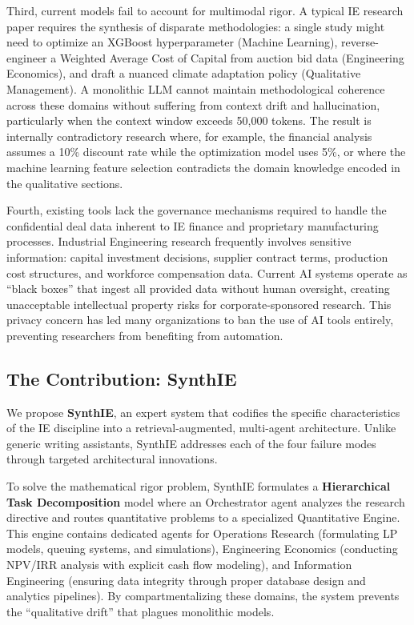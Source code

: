 \documentclass[12pt,a4paper]{article}
\begin{document}
Third, current models fail to account for multimodal rigor. A typical IE research paper requires the synthesis of disparate methodologies: a single study might need to optimize an XGBoost hyperparameter (Machine Learning), reverse-engineer a Weighted Average Cost of Capital from auction bid data (Engineering Economics), and draft a nuanced climate adaptation policy (Qualitative Management). A monolithic LLM cannot maintain methodological coherence across these domains without suffering from context drift and hallucination, particularly when the context window exceeds 50,000 tokens. The result is internally contradictory research where, for example, the financial analysis assumes a 10\% discount rate while the optimization model uses 5\%, or where the machine learning feature selection contradicts the domain knowledge encoded in the qualitative sections.

Fourth, existing tools lack the governance mechanisms required to handle the confidential deal data inherent to IE finance and proprietary manufacturing processes. Industrial Engineering research frequently involves sensitive information: capital investment decisions, supplier contract terms, production cost structures, and workforce compensation data. Current AI systems operate as ``black boxes'' that ingest all provided data without human oversight, creating unacceptable intellectual property risks for corporate-sponsored research. This privacy concern has led many organizations to ban the use of AI tools entirely, preventing researchers from benefiting from automation.

\subsection{The Contribution: SynthIE}

We propose \textbf{SynthIE}, an expert system that codifies the specific characteristics of the IE discipline into a retrieval-augmented, multi-agent architecture. Unlike generic writing assistants, SynthIE addresses each of the four failure modes through targeted architectural innovations.

To solve the mathematical rigor problem, SynthIE formulates a \textbf{Hierarchical Task Decomposition} model where an Orchestrator agent analyzes the research directive and routes quantitative problems to a specialized Quantitative Engine. This engine contains dedicated agents for Operations Research (formulating LP models, queuing systems, and simulations), Engineering Economics (conducting NPV/IRR analysis with explicit cash flow modeling), and Information Engineering (ensuring data integrity through proper database design and analytics pipelines). By compartmentalizing these domains, the system prevents the ``qualitative drift'' that plagues monolithic models.
\end{document}
